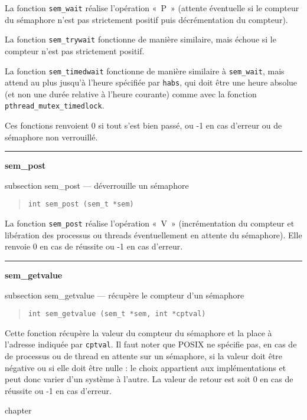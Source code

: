 \documentclass [twoside] {report}
\newcommand {\primitive} [1]
    {
	\phantomsection
	{\large \bf #1}
	\addcontentsline {toc} {subsection} {#1}
    }
\newcommand {\separation}
    {
	\vspace {5mm}
	\nopagebreak
	\hrule
    }
\begin{document}
La fonction \verb|sem_wait| réalise l'opération «~P~» (attente
éventuelle si le compteur du sémaphore n'est pas strictement positif
puis décrémentation du compteur).

La fonction \verb|sem_trywait| fonctionne de manière similaire,
mais échoue si le compteur n'est pas strictement positif.

La fonction \verb|sem_timedwait| fonctionne de manière similaire à
\verb|sem_wait|, mais attend au plus jusqu'à l'heure spécifiée par
\texttt {habs}, qui doit être une heure absolue (et non une durée
relative à l'heure courante) comme avec la fonction
\verb|pthread_mutex_timedlock|.

Ces fonctions renvoient 0 si tout s'est bien passé, ou -1 en cas d'erreur
ou de sémaphore non verrouillé.


\separation
\primitive {sem\_post} --- déverrouille un sémaphore

\begin {quote}
\begin {verbatim}
int sem_post (sem_t *sem)
\end{verbatim}
\end {quote}

La fonction \verb|sem_post| réalise l'opération «~V~» (incrémentation
du compteur et libération des processus ou threads éventuellement
en attente du sémaphore). Elle renvoie 0 en cas de réussite ou -1 en
cas d'erreur.


\separation
\primitive {sem\_getvalue} --- récupère le compteur d'un sémaphore

\begin {quote}
\begin {verbatim}
int sem_getvalue (sem_t *sem, int *cptval)
\end{verbatim}
\end {quote}

Cette fonction récupère la valeur du compteur du sémaphore et la
place à l'adresse indiquée par \texttt {cptval}. Il faut noter que
POSIX ne spécifie pas, en cas de de processus ou de thread en attente
sur un sémaphore, si la valeur doit être négative ou si elle doit
être nulle : le choix appartient aux implémentations et peut donc
varier d'un système à l'autre. La valeur de retour est soit 0 en cas
de réussite ou -1 en cas d'erreur.



% 
% 



\appendix
\cleardoublepage
{}			%
 {chapter} {\indexname}
\printindex
\end{document}
